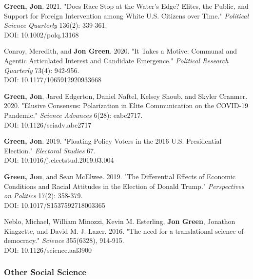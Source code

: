 \documentclass[letterpaper]{article}
\begin{document}
\begin{etaremune}
\item \textbf{Green, Jon}. 2021. "Does Race Stop at the Water's Edge? Elites, the Public, and Support for Foreign Intervention among White U.S. Citizens over Time." \textit{Political Science Quarterly} 136(2): 339-361. \\
DOI: 10.1002/polq.13168

\item Conroy, Meredith, and \textbf{Jon Green}. 2020. "It Takes a Motive: Communal and Agentic Articulated Interest and Candidate Emergence."  \textit{Political Research Quarterly} 73(4): 942-956. \\
DOI: 10.1177/1065912920933668

\item \textbf{Green, Jon}, Jared Edgerton, Daniel Naftel, Kelsey Shoub, and Skyler Cranmer. 2020. "Elusive Consensus: Polarization in Elite Communication on the COVID-19 Pandemic." \textit{Science Advances} 6(28): eabc2717. \\
DOI: 10.1126/sciadv.abc2717

\item \textbf{Green, Jon}. 2019. "Floating Policy Voters in the 2016 U.S. Presidential Election." \textit{Electoral Studies} 67. \\
DOI: 10.1016/j.electstud.2019.03.004

\item \textbf{Green, Jon}, and Sean McElwee. 2019. "The Differential Effects of Economic Conditions and Racial Attitudes in the Election of Donald Trump." \textit{Perspectives on Politics} 17(2): 358-379. \\
DOI: 10.1017/S1537592718003365

\item Neblo, Michael, William Minozzi, Kevin M. Esterling, \textbf{Jon Green}, Jonathon Kingzette, and David M. J. Lazer. 2016. "The need for a translational science of democracy." \textit{Science} 355(6328), 914-915.\\
DOI: 10.1126/science.aal3900

\end{etaremune}

\subsubsection*{Other Social Science}
\end{document}
